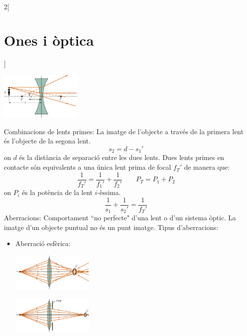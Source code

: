 \documentclass[../../../main.tex]{subfiles}
\begin{document}
\begin{multicols}{2}[\section{Ones i òptica}]
\begin{minipage}{\linewidth}
  \end{minipage}
  \begin{minipage}{\linewidth}
    \centering
    \includegraphics[width=4cm]{Physics/1st/Waves_and_optics/Images/raiglen2.jpg}
  \end{minipage}
  Combinacions de lents primes: La imatge de l'objecte a través de la primera lent és l'objecte de la segona lent. $$s_2=d-s_1'$$ {\footnotesize on $d$ és la distància de separació entre les dues lents.}
  Dues lents primes en contacte són equivalents a una única lent prima de focal $f_T'$ de manera que: $$\frac{1}{f_T'}=\frac{1}{f_1'}+\frac{1}{f_2'}\qquad P_T=P_1+P_2$$ {\footnotesize on $P_i$ és la potència de la lent $i$-èssima.}
  $$\frac{1}{s_1}+\frac{1}{s_2'}=\frac{1}{f_T'}$$
  Aberracions: Comportament ``no perfecte" d'una lent o d'un sistema òptic. La imatge d'un objecte puntual no és un punt imatge.
  Tipus d'aberracions:
  \begin{itemize}
    \item Aberració esfèrica:\newline
          \begin{minipage}{\linewidth}
            \centering \includegraphics[width=4cm]{Physics/1st/Waves_and_optics/Images/aberr1.jpg}
          \end{minipage}
          \begin{minipage}{\linewidth}
            \centering \includegraphics[width=4cm]{Physics/1st/Waves_and_optics/Images/aberr2.jpg}
          \end{minipage}

\end{itemize}
\end{multicols}
\end{document}
